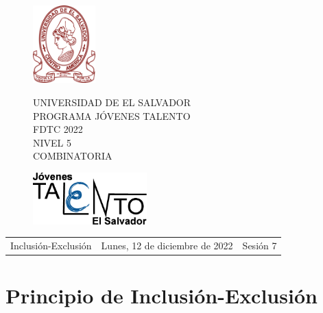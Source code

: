 \documentclass[12pt]{article}
\newcommand{\tema}{Inclusión-Exclusión}
\newcommand{\fecha}{Lunes, 12 de diciembre de 2022}
\newcommand{\sesion}{Sesión 7}
\begin{document}
\thispagestyle{empty}

\begin{figure}[h] 
	\begin{minipage}[b]{0.26\textwidth}
		\begin{center}
			\includegraphics[height=3cm]{Logos/UES.png}
			\par\end{center}
	\end{minipage} 
	\begin{minipage}[b]{0.46\textwidth}
		\begin{center}
			UNIVERSIDAD DE EL SALVADOR\\ [0.1cm]
			PROGRAMA JÓVENES TALENTO\\ [0.1cm]
	        FDTC 2022\\ [0.1cm]
                NIVEL 5\\ [0.1cm]
			COMBINATORIA 
			\par\end{center}
	\end{minipage} 
	\begin{minipage}[b]{0.05\textwidth}
		\begin{center}
			\includegraphics[height=2cm]{Logos/LOGO PJT.png}
			\par\end{center}
	\end{minipage}
\end{figure}

\begin{center}
    \begin{tabular}{p{4.5cm} p{7cm} p{4.5cm}}
        \tema & \centering\fecha & \hfill\sesion
    \end{tabular}
\end{center}

\section{Principio de Inclusión-Exclusión}
\end{document}
